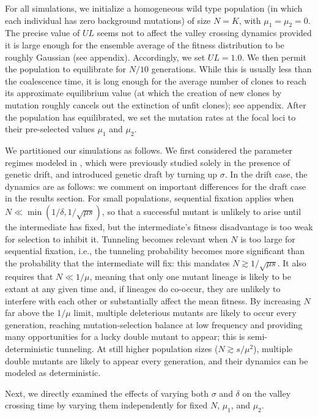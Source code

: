 \documentclass[10pt,twocolumn,twoside]{gsajnl}
\begin{document}
\begin{spacing}{1.5}
For all simulations, we initialize a homogeneous wild type population (in which each individual has zero background mutations) of size $N = K$, with $\mu_1 = \mu_2 = 0$.
The precise value of $UL$ seems not to affect the valley crossing dynamics provided it is large enough for the ensemble average of the fitness distribution to be roughly Gaussian (see appendix).
Accordingly, we set $UL = 1.0$.
We then permit the population to equilibrate for $N/10$ generations.
While this is usually less than the coalescence time, it is long enough for the average number of clones to reach its approximate equilibrium value (at which the creation of new clones by mutation roughly cancels out the extinction of unfit clones); see appendix.
After the population has equilibrated, we set the mutation rates at the focal loci to their pre-selected values $\mu_1$ and $\mu_2$.

We partitioned our simulations as follows.
We first considered the parameter regimes modeled in \citet{weissman_2009}, which were previously studied solely in the presence of genetic drift, and introduced genetic draft by turning up $\sigma$.
In the drift case, the dynamics are as follows: we comment on important differences for the draft case in the results section.
For small populations, sequential fixation applies when $N \ll \min(1/\delta, 1/\sqrt{\mu s})$, so that a successful mutant is unlikely to arise until the intermediate has fixed, but the intermediate's fitness disadvantage is too weak for selection to inhibit it.
Tunneling becomes relevant when $N$ is too large for sequential fixation, i.e., the tunneling probability becomes more significant than the probability that the intermediate will fix: this mandates $N \gtrsim 1/\sqrt{\mu s}$.
It also requires that $N \ll 1/\mu$, meaning that only one mutant lineage is likely to be extant at any given time and, if lineages do co-occur, they are unlikely to interfere with each other or substantially affect the mean fitness.
By increasing $N$ far above the $1/\mu$ limit, multiple deleterious mutants are likely to occur every generation, reaching mutation-selection balance at low frequency and providing many opportunities for a lucky double mutant to appear; this is semi-deterministic tunneling.
At still higher population sizes ($N \gtrsim s/\mu^2$), multiple double mutants are likely to appear every generation, and their dynamics can be modeled as deterministic.

Next, we directly examined the effects of varying both $\sigma$ and $\delta$ on the valley crossing time by varying them independently for fixed $N$, $\mu_1$, and $\mu_2$.


\end{spacing}
\end{document}
